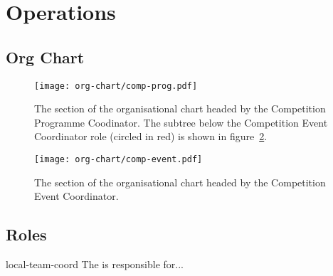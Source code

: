 \section{Operations}
\label{sec:comp-prog-ops}

\subsection{Org Chart}
\begin{landscape}
  \begin{figure}
    \begin{center}
      \texttt{[image: org-chart/comp-prog.pdf]}
    \end{center}
    \caption{\label{fig:org-chart-prog}The section of the organisational chart headed by the Competition Programme Coodinator.  The subtree below the Competition Event Coordinator role (circled in red) is shown in figure~\ref{fig:org-chart-event}.}
  \end{figure}
\end{landscape}

\begin{landscape}
  \begin{figure}
    \begin{center}
      \texttt{[image: org-chart/comp-event.pdf]}
    \end{center}
    \caption{\label{fig:org-chart-event}The section of the organisational chart headed by the Competition Event Coordinator.}
  \end{figure}
\end{landscape}

\subsection{Roles}

\begin{roledesc}{local-team-coord}
  The  is responsible for...
\end{roledesc}
